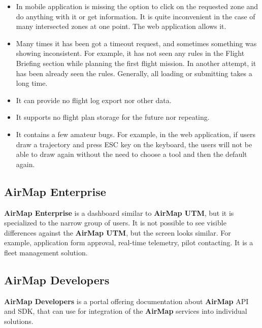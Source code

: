 \begin{itemize}
    \item In mobile application is missing the option to click on the requested zone and do anything with it or get information.
    It is quite inconvenient in the case of many intersected zones at one point.
    The web application allows it.
    \item Many times it has been got a timeout request, and sometimes something was showing inconsistent.
    For example, it has not seen any rules in the Flight Briefing section while planning the first flight mission.
    In another attempt, it has been already seen the rules.
    Generally, all loading or submitting takes a long time.
    \item It can provide no flight log export nor other data.
    \item It supports no flight plan storage for the future nor repeating.
    \item It contains a few amateur bugs.
    For example, in the web application, if users draw a trajectory and press ESC key on the keyboard, the users will not be able to draw again without the need to choose a tool and then the default again.
\end{itemize}


\subsection{AirMap Enterprise}\label{subsec:airmap-enterprise}
\textbf{AirMap Enterprise} is a dashboard similar to \textbf{AirMap UTM}, but it is specialized to the narrow group of users.
It is not possible to see visible differences against the \textbf{AirMap UTM}, but the screen looks similar.
For example, application form approval, real-time telemetry, pilot contacting.
It is a fleet management solution.


\subsection{AirMap Developers}\label{subsec:airmap-developers}
\textbf{AirMap Developers} is a portal offering documentation about \textbf{AirMap} API and SDK, that can use for integration of the \textbf{AirMap} services into individual solutions.~\cite{airMapDevelopers}
